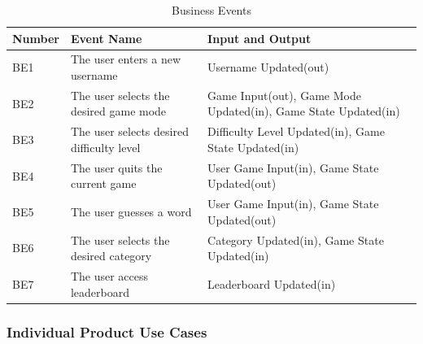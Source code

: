 \documentclass[12pt, titlepage]{article}
\begin{document}
\begin{table}[h]
	\begin{center}
		\begin{tabular}{|p{}|p{}|p{}|}
			\hline
			Number & Event Name & Input and Output\\ 
			\hline
			BE1 & The user enters a new username & Username Updated(out) \\
			\hline
			BE2 & The user selects the desired game mode & Game Input(out), Game Mode Updated(in), Game State Updated(in) \\ 
			\hline
			BE3 & The user selects desired difficulty level & Difficulty Level Updated(in), Game State Updated(in)\\
			\hline
			BE4 & The user quits the current game & User Game Input(in), Game State Updated(out)\\
			\hline
			BE5 & The user guesses a word & User Game Input(in), Game State Updated(out)\\
			\hline
			BE6 & The user selects the desired category & Category Updated(in), Game State Updated(in) \\
			\hline
			BE7 & The user access leaderboard & Leaderboard Updated(in) \\
			\hline
		\end{tabular}
	\end{center}
	\caption{Business Events}
	\label{tab:my_label}
\end{table}

\newpage

\subsubsection{Individual Product Use Cases}
\end{document}

